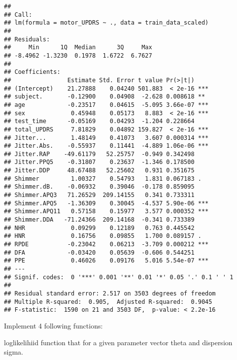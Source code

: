 \documentclass[
]{article}
\begin{document}
\begin{verbatim}
## 
## Call:
## lm(formula = motor_UPDRS ~ ., data = train_data_scaled)
## 
## Residuals:
##     Min      1Q  Median      3Q     Max 
## -8.4962 -1.3230  0.1978  1.6722  6.7627 
## 
## Coefficients:
##                Estimate Std. Error t value Pr(>|t|)    
## (Intercept)    21.27888    0.04240 501.883  < 2e-16 ***
## subject.       -0.12900    0.04908  -2.628 0.008618 ** 
## age            -0.23517    0.04615  -5.095 3.66e-07 ***
## sex             0.45948    0.05173   8.883  < 2e-16 ***
## test_time      -0.05169    0.04293  -1.204 0.228664    
## total_UPDRS     7.81829    0.04892 159.827  < 2e-16 ***
## Jitter...       1.48149    0.41073   3.607 0.000314 ***
## Jitter.Abs.    -0.55937    0.11441  -4.889 1.06e-06 ***
## Jitter.RAP    -49.61179   52.25757  -0.949 0.342498    
## Jitter.PPQ5    -0.31807    0.23637  -1.346 0.178500    
## Jitter.DDP     48.67488   52.25602   0.931 0.351675    
## Shimmer         1.00327    0.54793   1.831 0.067183 .  
## Shimmer.dB.    -0.06932    0.39046  -0.178 0.859095    
## Shimmer.APQ3   71.26529  209.14155   0.341 0.733311    
## Shimmer.APQ5   -1.36309    0.30045  -4.537 5.90e-06 ***
## Shimmer.APQ11   0.57158    0.15977   3.577 0.000352 ***
## Shimmer.DDA   -71.24366  209.14168  -0.341 0.733389    
## NHR             0.09299    0.12189   0.763 0.445542    
## HNR             0.16756    0.09855   1.700 0.089157 .  
## RPDE           -0.23042    0.06213  -3.709 0.000212 ***
## DFA            -0.03420    0.05639  -0.606 0.544251    
## PPE             0.46026    0.09176   5.016 5.54e-07 ***
## ---
## Signif. codes:  0 '***' 0.001 '**' 0.01 '*' 0.05 '.' 0.1 ' ' 1
## 
## Residual standard error: 2.517 on 3503 degrees of freedom
## Multiple R-squared:  0.905,  Adjusted R-squared:  0.9045 
## F-statistic:  1590 on 21 and 3503 DF,  p-value: < 2.2e-16
\end{verbatim}

Implement 4 following functions:

loglikelihiid function that for a given parameter vector theta and
dispersion sigma.
\end{document}
